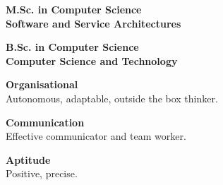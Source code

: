 \documentclass[9pt, green]{template/developercv} %
\begin{document}
{\begin{minipage}[t]{0.32\textwidth}
	\vspace{1.2em}
	\begin{minipage}[t]{\linewidth}
		\vspace{-\baselineskip}
		\vspace{0mm}
		\small \textbf{M.Sc. in Computer Science} \hfill\vspace{0mm}\\ 
		\footnotesize \textbf{Software and Service Architectures\vspace{0mm}}\\
		\footnotesize \textcolor{accentbackground}{}
	\end{minipage}\hfill
	\vspace{2em}
	\begin{minipage}[t]{\linewidth}
		\vspace{-\baselineskip}
		\vspace{0mm}
		\small \textbf{B.Sc. in Computer Science} \hfill\vspace{0mm}\\
		\footnotesize \textbf{Computer Science and Technology\vspace{0mm}}\\
		\footnotesize \textcolor{accentbackground}{}
	\end{minipage}\hfill
	\vspace{1.2em}
\end{minipage}
\hfill
\begin{minipage}[t]{0.32\textwidth}
	\vspace{-\baselineskip} %
	
	\vspace{1.2mm}
	\textcolor{accentbackground}{\faCalendar}\hspace{0.5mm}  \small{\textbf{Organisational}} \\
	\footnotesize Autonomous, adaptable, outside the box thinker.
	
	\vspace{2.5mm}
	\textcolor{accentbackground}{\faComment}\hspace{0.5mm}
	\small{\textbf{Communication}} \\ 
	\footnotesize Effective communicator and team worker.
	
	\vspace{2.5mm}
	\textcolor{accentbackground}{\faChild}\hspace{1mm} \small{\textbf{Aptitude}} \\ 
	\footnotesize Positive, precise.
\end{minipage}
\hfill
\begin{minipage}[t]{0.28\textwidth}
	\vspace{-\baselineskip} %
	

\end{minipage}}
\end{document}
